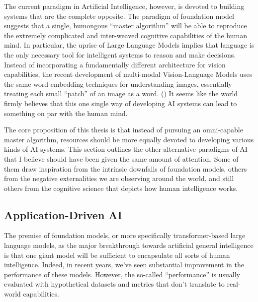 \documentclass[12pt]{article}
\begin{document}
The current paradigm in Artificial Intelligence, however, is devoted to building systems that are the complete opposite. The paradigm of foundation model suggests that a single, humongous ``master algorithm'' will be able to reproduce the extremely complicated and inter-weaved cognitive capabilities of the human mind. In particular, the uprise of Large Language Models implies that language is the only necessary tool for intelligent systems to reason and make decisions. Instead of incorporating a fundamentally different architecture for vision capabilities, the recent development of multi-modal Vision-Language Models uses the same word embedding techniques for understanding images, essentially treating each small ``patch'' of an image as a word. (\cite{dosovitskiy2021imageworth16x16words}) It seems like the world firmly believes that this one single way of developing AI systems can lead to something on par with the human mind.

The core proposition of this thesis is that instead of pursuing an omni-capable master algorithm, resources should be more equally devoted to developing various kinds of AI systems. This section outlines the other alternative paradigms of AI that I believe should have been given the same amount of attention. Some of them draw inspiration from the intrinsic downfalls of foundation models, others from the negative externalities we are observing around the world, and still others from the cognitive science that depicts how human intelligence works.

\subsection{Application-Driven AI}
The premise of foundation models, or more specifically transformer-based large language models, as the major breakthrough towards artificial general intelligence is that one giant model will be sufficient to encapsulate all sorts of human intelligence. Indeed, in recent years, we've seen substantial improvement in the performance of these models. However, the so-called ``performance'' is usually evaluated with hypothetical datasets and metrics that don't translate to real-world capabilities.
\end{document}
